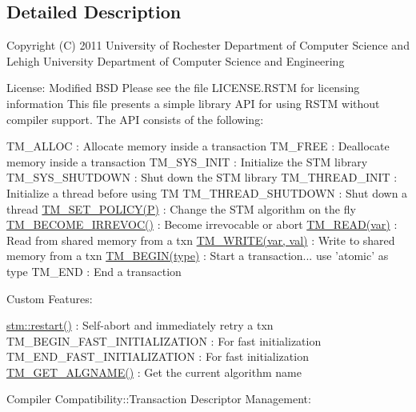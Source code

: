 \subsection{Detailed Description}
Copyright (C) 2011 University of Rochester Department of Computer Science and Lehigh University Department of Computer Science and Engineering

License\-: Modified B\-S\-D Please see the file L\-I\-C\-E\-N\-S\-E.\-R\-S\-T\-M for licensing information This file presents a simple library A\-P\-I for using R\-S\-T\-M without compiler support. The A\-P\-I consists of the following\-:

T\-M\-\_\-\-A\-L\-L\-O\-C \-: Allocate memory inside a transaction T\-M\-\_\-\-F\-R\-E\-E \-: Deallocate memory inside a transaction T\-M\-\_\-\-S\-Y\-S\-\_\-\-I\-N\-I\-T \-: Initialize the S\-T\-M library T\-M\-\_\-\-S\-Y\-S\-\_\-\-S\-H\-U\-T\-D\-O\-W\-N \-: Shut down the S\-T\-M library T\-M\-\_\-\-T\-H\-R\-E\-A\-D\-\_\-\-I\-N\-I\-T \-: Initialize a thread before using T\-M T\-M\-\_\-\-T\-H\-R\-E\-A\-D\-\_\-\-S\-H\-U\-T\-D\-O\-W\-N \-: Shut down a thread \hyperlink{library_8hpp_ad9ca1f96933ab26056b7bf40f6d0b982}{T\-M\-\_\-\-S\-E\-T\-\_\-\-P\-O\-L\-I\-C\-Y(\-P)} \-: Change the S\-T\-M algorithm on the fly \hyperlink{library_8hpp_ab6de3b726da330cbf6350d08a48ec2a2}{T\-M\-\_\-\-B\-E\-C\-O\-M\-E\-\_\-\-I\-R\-R\-E\-V\-O\-C()} \-: Become irrevocable or abort \hyperlink{library_8hpp_a976eeec02c2b700b8d954159e26e57d1}{T\-M\-\_\-\-R\-E\-A\-D(var)} \-: Read from shared memory from a txn \hyperlink{library_8hpp_aad8767849818c377a9ac7d5c842dd2d8}{T\-M\-\_\-\-W\-R\-I\-T\-E(var, val)} \-: Write to shared memory from a txn \hyperlink{tm_8h_a7f26ce9bbeeebe09f8fca438a08f82c4}{T\-M\-\_\-\-B\-E\-G\-I\-N(type)} \-: Start a transaction... use 'atomic' as type T\-M\-\_\-\-E\-N\-D \-: End a transaction

Custom Features\-:

\hyperlink{namespacestm_ab344bb49ceb6098cdc32aba5d36e76f3}{stm\-::restart()} \-: Self-\/abort and immediately retry a txn T\-M\-\_\-\-B\-E\-G\-I\-N\-\_\-\-F\-A\-S\-T\-\_\-\-I\-N\-I\-T\-I\-A\-L\-I\-Z\-A\-T\-I\-O\-N \-: For fast initialization T\-M\-\_\-\-E\-N\-D\-\_\-\-F\-A\-S\-T\-\_\-\-I\-N\-I\-T\-I\-A\-L\-I\-Z\-A\-T\-I\-O\-N \-: For fast initialization \hyperlink{library_8hpp_a46b38feceaf4dcbd5dc88c33377c86c7}{T\-M\-\_\-\-G\-E\-T\-\_\-\-A\-L\-G\-N\-A\-M\-E()} \-: Get the current algorithm name

Compiler Compatibility\-::\-Transaction Descriptor Management\-:

